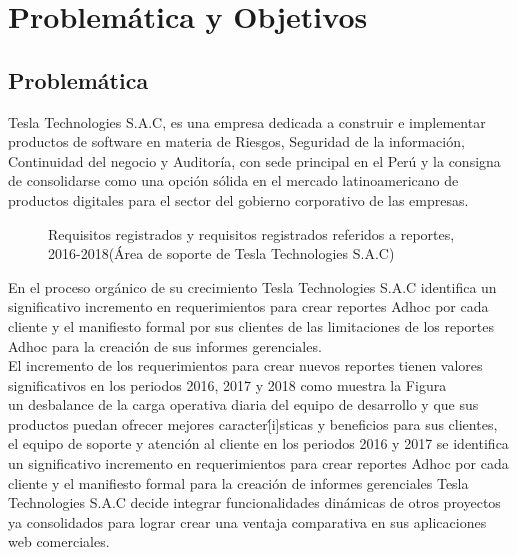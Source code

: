 \chapter{Problemática y Objetivos} \label{chapter:I}
\section{Problem\'{a}tica}
\begin{spacing}{1.5}
	Tesla Technologies S.A.C, es una empresa dedicada a construir e implementar productos de software en materia de Riesgos, Seguridad de la información, Continuidad del negocio y Auditoría, con sede principal en el Perú y la consigna de consolidarse como una opci\'{o}n s\'{o}lida en el mercado latinoamericano de productos digitales para el sector del gobierno corporativo de las empresas.\\
	\begin{figure}[hbt]
		\caption {\centering Requisitos registrados y requisitos registrados referidos a reportes,  2016-2018(\'{A}rea de soporte de Tesla Technologies S.A.C)}
	\end{figure}		                         
	En el proceso org\'{a}nico de su crecimiento Tesla Technologies S.A.C  identifica un significativo incremento en requerimientos para crear reportes Adhoc por cada cliente y el manifiesto formal por sus clientes de las limitaciones de los reportes Adhoc para la creación de sus informes gerenciales.\\
	El incremento de los requerimientos para crear nuevos reportes tienen valores significativos en los periodos 2016, 2017 y 2018 como muestra la Figura \\
	un desbalance de la carga operativa diaria del equipo de desarrollo y que sus productos puedan ofrecer mejores caracter\'[i]sticas y beneficios para sus clientes, el equipo de soporte y atenci\'{o}n al cliente  en los periodos 2016 y 2017 se identifica un significativo incremento en requerimientos para crear reportes Adhoc por cada cliente y el manifiesto formal   para la creación de informes gerenciales Tesla Technologies S.A.C decide integrar funcionalidades dinámicas de otros proyectos ya consolidados para lograr crear una ventaja comparativa en sus aplicaciones web comerciales.

\end{spacing}
